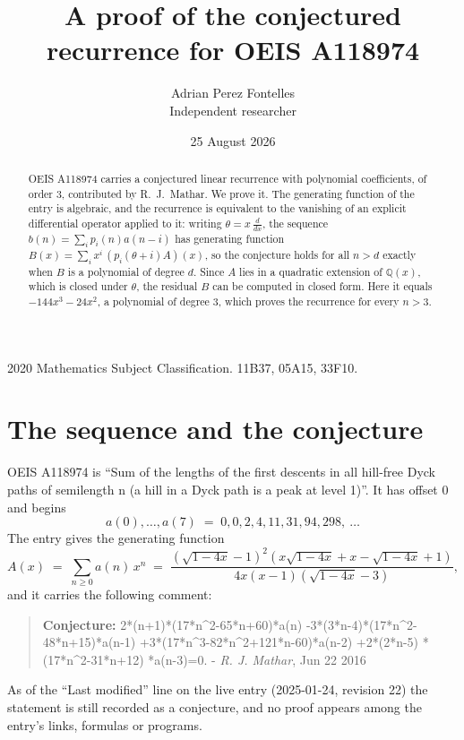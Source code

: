 \documentclass[11pt,a4paper]{article}
\title{A proof of the conjectured recurrence for OEIS A118974}
\author{Adrian Perez Fontelles\\ \small Independent researcher}
\date{25 August 2026}
\theoremstyle{plain}
\theoremstyle{definition}
\begin{document}
\maketitle

\begin{abstract}
OEIS A118974 carries a conjectured linear recurrence with polynomial coefficients, of
order 3, contributed by R.~J.~Mathar. We prove it. The generating function of the
entry is algebraic, and the recurrence is equivalent to the vanishing of an explicit
differential operator applied to it: writing $\theta=x\,\frac{d}{dx}$, the sequence
$b(n)=\sum_{i}p_{i}(n)a(n-i)$ has generating function
$B(x)=\sum_{i}x^{i}\,(p_{i}(\theta+i)A)(x)$, so the conjecture holds for all $n>d$ exactly
when $B$ is a polynomial of degree $d$. Since $A$ lies in a quadratic extension of
$\mathbb{Q}(x)$, which is closed under $\theta$, the residual $B$ can be computed in
closed form. Here it equals $- 144 x^{3} - 24 x^{2}$, a polynomial of degree $3$, which proves
the recurrence for every $n>3$.
\end{abstract}

\noindent\small 2020 Mathematics Subject Classification. 11B37, 05A15, 33F10.\normalsize

\section{The sequence and the conjecture}

OEIS A118974 is ``Sum of the lengths of the first descents in all hill-free Dyck paths of semilength n (a hill in a Dyck path is a peak at level 1)''. It has offset $0$ and begins
\[
a(0),\dots,a(7)\;=\;0, 0, 2, 4, 11, 31, 94, 298,\ \dots
\]
The entry gives the generating function
\begin{equation}\label{eq:gf}
A(x)\;=\;\sum_{n\ge 0} a(n)\,x^{n}\;=\;\frac{\left(\sqrt{1 - 4 x} - 1\right)^{2} \left(x \sqrt{1 - 4 x} + x - \sqrt{1 - 4 x} + 1\right)}{4 x \left(x - 1\right) \left(\sqrt{1 - 4 x} - 3\right)} ,
\end{equation}
and it carries the following comment:
\begin{quote}\small
\textbf{Conjecture:} 2*(n+1)*(17*n\^{}2-65*n+60)*a(n) -3*(3*n-4)*(17*n\^{}2-48*n+15)*a(n-1) +3*(17*n\^{}3-82*n\^{}2+121*n-60)*a(n-2) +2*(2*n-5) *(17*n\^{}2-31*n+12) *a(n-3)=0. - \emph{R. J. Mathar}, Jun 22 2016
\end{quote}
As of the ``Last modified'' line on the live entry (2025-01-24, revision 22) the
statement is still recorded as a conjecture, and no proof appears among the entry's links,
formulas or programs.
\end{document}
